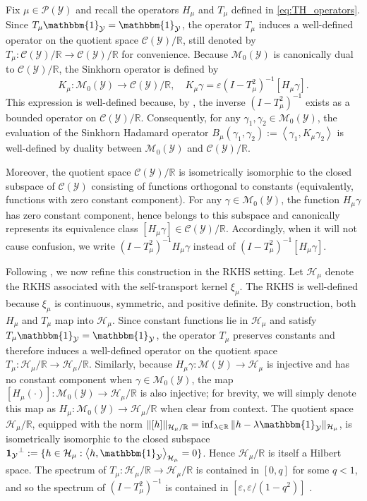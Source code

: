 \documentclass{article}
\theoremstyle{plain}
\theoremstyle{definition}
\theoremstyle{remark}
\newcommand{\R}{\mathbb{R}}
\newcommand{\cH}{\mathcal{H}}
\newcommand{\cP}{\mathcal{P}}
\newcommand{\cC}{\mathcal{C}}
\newcommand{\cM}{\mathcal{M}}
\newcommand{\cY}{\mathcal{Y}}
\newcommand{\1}{\mathbbm{1}}
\newcommand{\eps}{\varepsilon}
\newcommand{\iprod}[1]{\left\langle #1 \right\rangle}
\theoremstyle{plain}
\theoremstyle{definition}
\begin{document}
Fix $\mu \in \cP(\cY)$ and recall the operators $H_\mu$ and $T_\mu$ defined in \eqref{eq:TH_operators}. Since $T_\mu \1_\cY = \1_\cY$, the operator $T_\mu$ induces a well-defined operator on the quotient space $\cC(\cY)/\R$, still denoted by $T_\mu: \cC(\cY)/\R \to \cC(\cY)/\R$ for convenience. Because $\cM_0(\cY)$ is canonically dual to $\cC(\cY)/\R$, the Sinkhorn operator is defined by
\[
K_\mu: \cM_0(\cY) \to \cC(\cY) / \R, \quad K_\mu \gamma = \eps (I - T_\mu^2)^{-1} [H_\mu \gamma].
\]
This expression is well-defined because, by \citet[Thm.~3.8]{lavenant2024riemannian}, the inverse $(I - T_\mu^2)^{-1}$ exists as a bounded operator on $\cC(\cY)/\R$. Consequently, for any $\gamma_1, \gamma_2 \in \cM_0(\cY)$, the evaluation of the Sinkhorn Hadamard operator $B_\mu(\gamma_1, \gamma_2) := \iprod{\gamma_1, K_\mu \gamma_2}$ is well-defined by duality between $\cM_0(\cY)$ and $\cC(\cY) / \R$.

 Moreover, the quotient space $\cC(\cY)/\R$ is isometrically isomorphic to the closed subspace of $\cC(\cY)$ consisting of functions orthogonal to constants (equivalently, functions with zero constant component). For any $\gamma \in \cM_0(\cY)$, the function $H_\mu \gamma$ has zero constant component, hence belongs to this subspace and canonically represents its equivalence class $[H_\mu \gamma] \in \cC(\cY)/\R$. Accordingly, when it will not cause confusion, we write $(I - T_\mu^2)^{-1} H_\mu \gamma$ instead of $(I - T_\mu^2)^{-1} [H_\mu \gamma]$.

Following \citet{lavenant2024riemannian}, we now refine this construction in the RKHS setting.
Let $\cH_\mu$ denote the RKHS associated with the self-transport kernel $\xi_\mu$. The RKHS is well-defined because $\xi_\mu$ is continuous, symmetric, and positive definite.
By construction, both $H_\mu$ and $T_\mu$ map into $\cH_\mu$. Since constant functions lie in $\cH_\mu$ and satisfy $T_\mu \1_{\cY} = \1_{\cY}$, the operator $T_\mu$ preserves constants and therefore induces a well-defined operator on the quotient space $T_\mu : \cH_\mu/\R \to \cH_\mu/\R$.
Similarly, because $H_\mu \gamma : \cM(\cY) \to \cH_\mu$ is injective and has no constant component when $\gamma \in \cM_0(\cY)$, the map $[H_\mu(\cdot)] : \cM_0(\cY) \to \cH_\mu/\R$ is also injective; for brevity, we will simply denote this map as $H_\mu : \cM_0(\cY) \to \cH_\mu/\R$ when clear from context.  
The quotient space $\cH_\mu/\R$, equipped with the norm $\|[h]\|_{{\cH_\mu/\R}} = \inf_{\lambda \in \R}
\|h - \lambda \1_{\cY}\|_{\cH_\mu}$, is isometrically isomorphic to the closed subspace ${\mathbf{1}_{\cY}}^{\perp} := \{h \in \cH_\mu: \iprod{h, \1_{\cY}}_{\cH_\mu} = 0\}$.
Hence $\cH_\mu/\R$ is itself a Hilbert space.
The spectrum of $T_\mu: \cH_\mu/\R \to \cH_\mu/\R$ is contained in $[0,q]$ for some $q<1$, and so the spectrum of $(I - T_\mu^2)^{-1} $ is contained in $[\eps, \eps/(1-q^2)]$ \citep[Thm.~4.3]{lavenant2024riemannian}.
\end{document}
